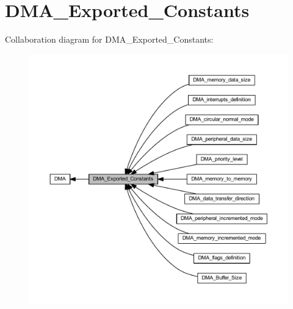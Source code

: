 \hypertarget{group___d_m_a___exported___constants}{}\section{D\+M\+A\+\_\+\+Exported\+\_\+\+Constants}
\label{group___d_m_a___exported___constants}
Collaboration diagram for D\+M\+A\+\_\+\+Exported\+\_\+\+Constants\+:
\nopagebreak
\begin{figure}[H]
\begin{center}
\leavevmode
\includegraphics[width=350pt]{group___d_m_a___exported___constants}
\end{center}
\end{figure}
